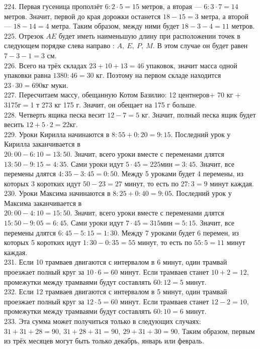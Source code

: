 224. Первая гусеница проползёт $6:2\cdot5=15$ метров, а вторая --- $6:3\cdot7=14$ метров. Значит, первой до края дорожки останется $18-15=3$ метра, а второй --- $18-14=4$ метра. Таким образом, между ними будет $18-3-4=11$ метров.\\
225. Отрезок $AE$ будет иметь наименьшую длину при расположении точек в следующем порядке слева направо : $A,\ E,\ P,\ M.$ В этом случае он будет равен $7-3-1=3$ см.\\
226. Всего на трёх складах $23+10+13=46$ упаковок, значит масса одной упаковки равна $1380:46=30$ кг. Поэтому на первом складе находится $23\cdot30=690$кг муки.\\
227. Пересчитаем массу, обещанную Котом Базилио: 12 центнеров$+$ 70 кг $+$ 3175г$=$1 т 273 кг 175 г. Значит, он обещает на 175 г больше.\\
228. Четверть ящика песка весит $12-7=5$ кг. Значит, полный песка ящик будет весить $12+5\cdot2=22$кг.\\
229. Уроки Кирилла начинаются в $8:55+0:20=9:15.$ Последний урок у Кирилла заканчивается в \\ $20:00-6:10=13:50.$ Значит, всего уроки вместе с переменами длятся $13:50-9:15=4:35.$ Сами уроки идут $5\cdot45=225\text{мин}=3:45.$ Значит, все перемены длятся $4:35-3:45=0:50.$ Между 5 уроками будет 4 перемены, из которых 3 коротких идут $50-23=27$ минут, то есть по $27:3=9$ минут каждая.\\
230. Уроки Максима начинаются в $8:25+0:40=9:05.$ Последний урок у Максима заканчивается в \\ $20:00-4:10=15:50.$ Значит, всего уроки вместе с переменами длятся $15:50-9:05=6:45.$ Сами уроки идут $7\cdot45=315\text{мин}=5:15.$ Значит, все перемены длятся $6:45-5:15=1:30.$ Между 7 уроками будет 6 перемен, из которых 5 коротких идут $1:30-0:35=55$ минут, то есть по $55:5=11$ минут каждая.\\
231. Если 10 трамваев двигаются с интервалом в 6 минут, один трамвай проезжает полный круг за $10\cdot6=60$ минут. Если трамваев станет $10+2=12,$ промежутки между трамваями будут составлять $60:12=5$ минут.\\
232. Если 12 трамваев двигаются с интервалом в 5 минут, один трамвай проезжает полный круг за $12\cdot5=60$ минут. Если трамваев станет $12-2=10,$ промежутки между трамваями будут составлять $60:10=6$ минут.\\
233. Эта сумма может получиться только в следующих случаях: $31+31+28=90,\ 31+28+31=90,\ 29+31+30=90.$ Таким образом, первым из трёх месяцев могут быть только декабрь, январь или февраль.\\
